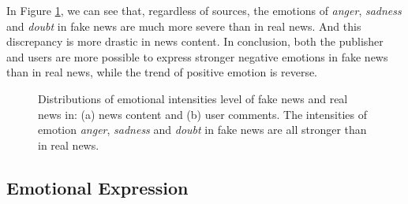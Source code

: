 \documentclass{article}
\newcommand{\kai}[1]{\textcolor{blue}{Kai: {#1}}}
\begin{document}
	In Figure \ref{Fig:emotionalIntensity}, we can see that, regardless of sources, the emotions of \textit{anger}, \textit{sadness} and \textit{doubt} in fake news are much more severe than in real news. And this discrepancy is more drastic in news content. In conclusion, both the publisher and users are more possible to express stronger negative emotions in fake news than in real news, while the trend of positive emotion is reverse.
	
	\begin{figure}[h]
		\centering
		
		\begin{minipage}[t]{0.23\textwidth}
		\end{minipage}
		\begin{minipage}[t]{0.23\textwidth}
		\end{minipage}
		
		\caption{Distributions of emotional intensities level of fake news and real news in: (a) news content and (b) user comments. The intensities of emotion \textit{anger}, \textit{sadness} and \textit{doubt} in fake news are all stronger than in real news.}
		\label{Fig:emotionalIntensity}
		\vspace{-0.3cm}
	\end{figure}
	
	\subsection{Emotional Expression}
	
\end{document}
